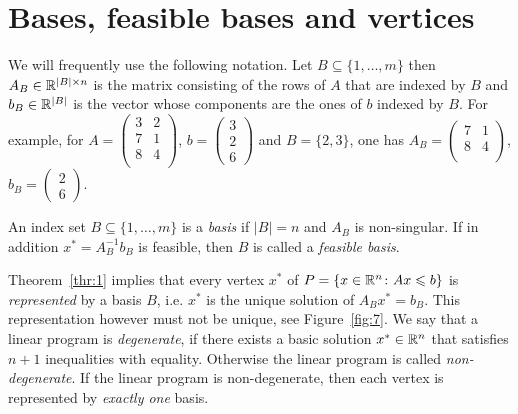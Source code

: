 \section{Bases, feasible bases and vertices}
\label{sec:non-degenerate-case}

We will frequently use the following notation. Let $B \subseteq \{1,\dots,m\}$ then $A_B \in \mathbb{R}^{|B| \times n}$ is the matrix consisting of the rows of $A$ that are indexed by   $B$ and $b_B \in \mathbb{R}^{|B|}$  is the vector whose components are the ones of $b$ indexed by $B$. For example, for 
$    A = 
    \begin{pmatrix}
      3 & 2  \\
      7 & 1\\
      8 & 4\\
    \end{pmatrix}$,  $b = 
    \begin{pmatrix}
      3 \\ 2\\ 6
    \end{pmatrix}$ 
and  $B = \{2,3\}$, one has $A_B =  \begin{pmatrix}
          7 & 1\\
      8 & 4\\
    \end{pmatrix}$,  $b_B = 
    \begin{pmatrix}
      2\\ 6
    \end{pmatrix}$. 

    \begin{definition}
      \label{def:s-1}
      An index set $B \subseteq \{1,\dots,m\}$ is a \emph{basis} if
      $|B| = n$ and $A_B$ is non-singular. If in addition $x^* =
      A_B^{-1} b_B$ is feasible, then $B$ is called a \emph{feasible
        basis}.
    \end{definition}

    Theorem~\ref{thr:1} implies that every vertex $x^*$ of $P = \{x
    \in \mathbb{R}^n \colon Ax \leqslant b\}$ is \emph{represented} by a basis $B$,
    i.e. $x^*$ is the unique solution of $A_Bx^* = b_B$. This
    representation however must not be unique, see
    Figure~\ref{fig:7}. We say that a linear program is \emph{degenerate}, if
    there exists a basic solution $x^* \in \mathbb{R}^n$ that satisfies $n+1$
    inequalities with equality. Otherwise the linear program is called
    \emph{non-degenerate}. If the linear program is non-degenerate,
    then each vertex is represented by \emph{exactly one} basis.

